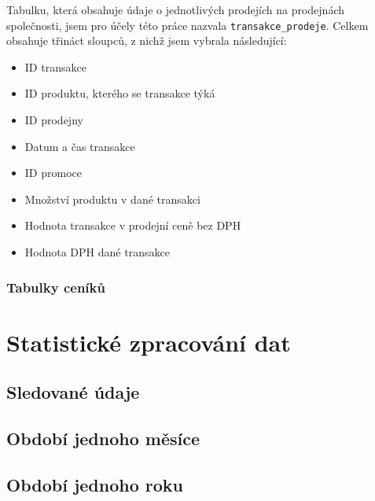 Tabulku, která obsahuje údaje o jednotlivých prodejích na prodejnách společnosti, jsem pro účely této práce nazvala \texttt{transakce\_prodeje}. Celkem obsahuje třináct sloupců, z nichž jsem vybrala následující:

\begin{itemize}
    \item ID transakce
    \item ID produktu, kterého se transakce týká
    \item ID prodejny
    \item Datum a čas transakce 
    \item ID promoce
    \item Množství produktu v dané transakci
    \item Hodnota transakce v prodejní ceně bez DPH
    \item Hodnota DPH dané transakce
\end{itemize}

\subsubsection{Tabulky ceníků}





\section{Statistické zpracování dat}

\subsection*{Sledované údaje}



\subsection*{Období jednoho měsíce}
\subsection*{Období jednoho roku}